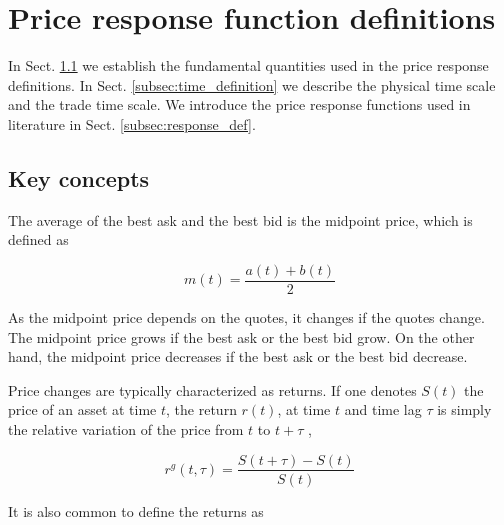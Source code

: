\section{Price response function definitions}
\label{sec:response_functions_def}

In Sect. \ref{subsec:key_concepts} we establish the fundamental quantities used
in the price response definitions. In Sect. \ref{subsec:time_definition} we
describe the physical time scale and the trade time scale. We introduce the
price response functions used in literature in Sect. \ref{subsec:response_def}.

\subsection{Key concepts}\label{subsec:key_concepts}

The average of the best ask and the best bid is the midpoint price, which is
defined as
\cite{subtle_nature,Bouchaud_2004,large_prices_changes,prop_order_book,stat_theory}

\begin{equation}\label{eq:midpoint_price}
    m\left(t\right)=\frac{a\left(t\right)+b\left(t\right)}{2}
\end{equation}

As the midpoint price depends on the quotes, it changes if the quotes change.
The midpoint price grows if the best ask or the best bid grow. On the other
hand, the midpoint price decreases if the best ask or the best bid
decrease.

Price changes are typically characterized as returns. If one denotes
$S\left( t\right)$ the price of an asset at time $t$, the return
$r\left(t\right)$, at time $t$ and time lag $\tau$ is simply the relative
variation of the price from $t$ to $t + \tau$
\cite{subtle_nature,empirical_facts,asynchrony_effects_corr,tick_size_impact,causes_epps_effect,non_stationarity},

\begin{equation}\label{eq:return_general}
    r^{g} \left(t, \tau \right) = \frac{S\left(t + \tau\right)
    - S\left(t\right)}{S\left(t\right)}
\end{equation}

It is also common to define the returns as
\cite{dissecting_cross,subtle_nature,empirical_facts,empirical_properties,large_prices_changes,pow_law_dist,theory_market_impact,spread_changes_affect,rand_mat,fluctions_market_friction}


